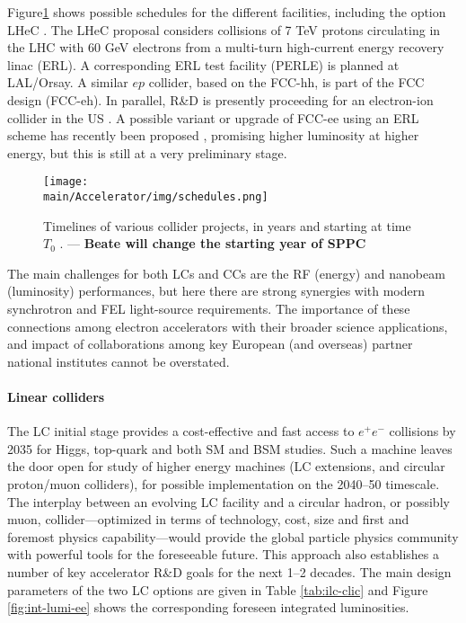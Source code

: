Figure\ref{fig:schedules} shows possible schedules for the different facilities, including the option LHeC \cite{lhecid}. The LHeC proposal considers collisions of 7 TeV protons circulating in the LHC with 60 GeV electrons from a multi-turn high-current energy recovery linac (ERL). A corresponding ERL test facility (PERLE) \cite{perleid} is planned at LAL/Orsay. A similar $ep$ collider, based on the FCC-hh, is part of the FCC design (FCC-eh). In parallel, R\&D is presently proceeding for an electron-ion collider in the US \cite{eicid}. 
A possible variant or upgrade of FCC-ee using an ERL scheme has recently been proposed \cite{bnl-erl}, promising higher luminosity at higher energy, 
but this is still at a very preliminary stage. 


 \begin{figure}[ht]
 \centering
 \texttt{[image: \\main/Accelerator/img/schedules.png]}
 \caption{Timelines of various collider projects, in years and starting at time $T_0$ \protect\cite{heinemann}. --- {\bf Beate will change the starting year of SPPC}}
\label{fig:schedules}
\end{figure}

The main challenges for both LCs and CCs are the RF (energy) and nanobeam (luminosity) performances, but here there are strong synergies with modern synchrotron and FEL light-source requirements. The importance of these connections among electron accelerators with their broader science applications, and impact of collaborations among key European (and overseas) partner national institutes cannot be overstated.

\paragraph*{Linear colliders}

The LC initial stage provides a cost-effective and fast access to $e^+e^-$ collisions by 2035 for Higgs, top-quark and both SM and BSM studies. Such a machine leaves the door open for study of higher energy machines (LC extensions, and circular proton/muon colliders), for possible implementation on the 2040--50 timescale. The interplay between an evolving LC facility and a circular hadron, or possibly muon, collider---optimized in terms of technology, cost, size and first and foremost physics capability---would provide the global particle physics community with powerful tools for the foreseeable future. This approach also establishes a number of key accelerator R\&D goals for the next 1--2 decades. The main design parameters of the two LC options are given in Table \ref{tab:ilc-clic}  and Figure \ref{fig:int-lumi-ee} shows the corresponding foreseen integrated luminosities.


